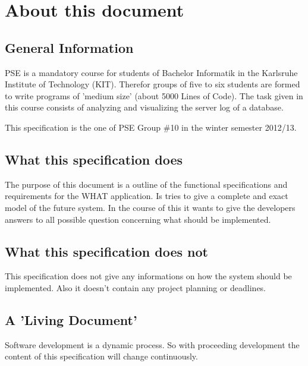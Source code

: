 \section*{About this document}


\subsection*{General Information}
PSE is a mandatory course for students of Bachelor Informatik in the %
Karlsruhe Institute of Technology (KIT). Therefor groups of five to six
students are formed to write programs of 'medium size' (about 5000 Lines of Code).
The task given in this course consists of analyzing and visualizing the server log of a database.

This specification is the one of PSE Group \#10 in the winter semester 2012/13.


\subsection*{What this specification does}
The purpose of this document is a outline of the functional specifications and requirements
for the WHAT application. Is tries to give a complete and exact model of the future system.
In the course of this it wants to give the developers answers to all possible question concerning
what should be implemented.


\subsection*{What this specification does not}
This specification does not give any informations on how the system should be implemented. 
Also it doesn't contain any project planning or deadlines.


\subsection*{A 'Living Document'}
Software development is a dynamic process. So with proceeding development the
content of this specification will change continuously. 



